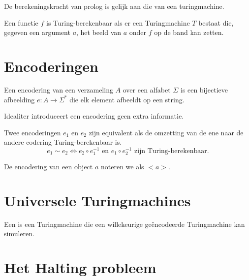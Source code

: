 \documentclass[main.tex]{subfiles}
\begin{document}
\begin{st}
  De berekeningskracht van prolog is gelijk aan die van een turingmachine.
\end{st}


\begin{de}
  Een functie $f$ is Turing-berekenbaar als er een Turingmachine $T$ bestaat die, gegeven een argument $a$, het beeld van $a$ onder $f$ op de band kan zetten.
\end{de}

\section{Encoderingen}
\label{sec:encoderingen}

\begin{de}
  Een encodering van een verzameling $A$ over een alfabet $\Sigma$ is een bijectieve afbeelding $e: A \rightarrow \Sigma^{*}$ die elk element afbeeldt op een string.
\end{de}

\begin{opm}
  Idealiter introduceert een encodering geen extra informatie.
\end{opm}

\begin{de}
  Twee encoderingen $e_{1}$ en $e_{2}$ zijn equivalent als de omzetting van de ene naar de andere codering Turing-berekenbaar is.
  \[ e_{1} \sim e_{2} \Leftrightarrow e_{2} \circ e_{1}^{-1} \text{ en } e_{1} \circ e_{2}^{-1} \text{ zijn Turing-berekenbaar.}\]
\end{de}

\begin{de}
  De encodering van een object $a$ noteren we als $<a>$.
\end{de}

\section{Universele Turingmachines}
\label{sec:univ-turingm}

\begin{de}
  Een  is een Turingmachine die een willekeurige ge\"encodeerde Turingmachine kan simuleren.
\end{de}

\section{Het Halting probleem}
\label{sec:het-halting-probleem}
\end{document}
